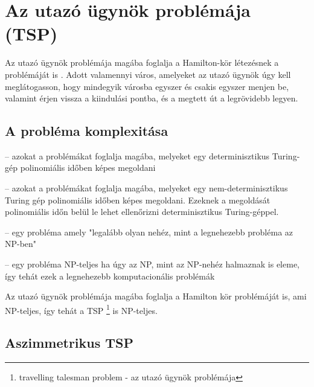 \chapter{Az utazó ügynök problémája (TSP)}\label{ch:ALAP}


Az utazó ügynök problémája magába foglalja a Hamilton-kör létezésnek a problémáját is \cite{gt_and_appl}. Adott valamennyi város, amelyeket az utazó ügynök úgy kell meglátogasson, hogy mindegyik városba egyszer és csakis egyszer menjen be, valamint érjen vissza a kiindulási pontba, és a megtett út a legrövidebb legyen.

\section{A probléma komplexitása}\label{sec:ALAP:adatelem}

\begin{description}
	\setlength{\itemsep}{0.04mm}
	\item[P] -- azokat a problémákat foglalja magába, melyeket egy determinisztikus Turing-gép polinomiális időben képes megoldani
	\item[NP] -- azokat a problémákat foglalja magába, melyeket egy nem-determinisztikus Turing gép polinomiális időben képes megoldani. Ezeknek a megoldását polinomiális időn belül le lehet ellenőrizni determinisztikus Turing-géppel.
	\item[NP-nehéz] -- egy probléma amely "legalább olyan nehéz, mint a legnehezebb probléma az NP-ben"
	\item[NP-teljes] -- egy probléma NP-teljes ha úgy az NP, mint az NP-nehéz halmaznak is eleme, így tehát ezek a legnehezebb komputacionális problémák
\end{description}


Az utazó ügynök problémája magába foglalja a Hamilton kör problémáját is, ami NP-teljes, így tehát a TSP%
\footnote{ %
	travelling talesman problem - az utazó ügynök problémája
}  %
 is NP-teljes.

\section{Aszimmetrikus TSP}\label{sec:ALAP:adatelem}


